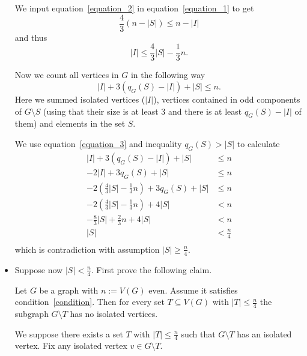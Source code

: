 \begin{exercise}{4}
\begin{itemize}
        We input equation~\ref{equation_2} in equation~\ref{equation_1} to get
        \begin{equation}
            \frac{4}{3} (n - |S|) \leq n - |I|
        \end{equation}
        and thus
        \begin{equation}\label{equation_3}
            |I| \leq \frac{4}{3} |S| - \frac{1}{3} n.
        \end{equation}

        Now we count all vertices in $G$ in the following way
        \begin{equation}\label{count_vertices}
            |I| + 3 \left(q_G(S) - |I|\right) + |S| \leq n.
        \end{equation}
            Here we summed isolated vertices ($|I|$), vertices contained in odd components of $G
        \setminus S$ (using that their size is at least $3$ and there is at least
        $q_G(S) - |I|$ of them) and elements in the set $S$.

        We use equation~\ref{equation_3} and inequality $q_G(S) > |S|$ to
        calculate
        \begin{align*}
            |I| + 3 \left(q_G(S) - |I|\right) + |S| &\leq n \\
            -2 |I| + 3 q_G(S) + |S| &\leq n \\
            -2 \left( \frac{4}{3} |S| - \frac{1}{3} n \right) + 3 q_G(S) + |S|
            &\leq n \\
            -2 \left( \frac{4}{3} |S| - \frac{1}{3} n \right) + 4 |S| &< n \\
            - \frac{8}{3} |S| + \frac{2}{3} n + 4 |S| &< n \\
            |S| &< \frac{n}{4} \\
        \end{align*}
            which is contradiction with assumption $|S| \geq \frac{n}{4}$.

        \item{}
        Suppose now $|S| < \frac{n}{4}$. First prove the following claim.
        \begin{claim}\label{claim_1}
            Let $G$ be a graph with $n := V(G)$ even. Assume it satisfies
            condition~\ref{condition}. Then for every set $T \subseteq V(G)$
            with $|T| \leq \frac{n}{4}$ the subgraph $G \setminus T$ has no
            isolated vertices.
        \end{claim}
        \begin{proof_claim}
            We suppose there exists a set $T$ with $|T| \leq \frac{n}{4}$ such
            that $G \setminus T$ has an isolated vertex. Fix any isolated vertex
            $v \in G \setminus T$.


\end{proof_claim}
\end{itemize}
\end{exercise}

